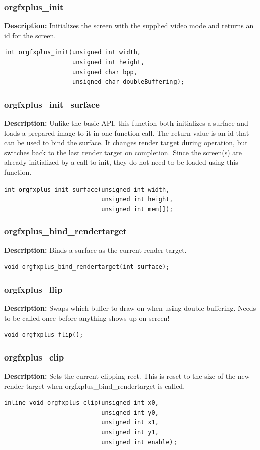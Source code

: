 \documentclass[10pt,a4paper]{article}
\begin{document}
\subsubsection{orgfxplus\_init}
\textbf{Description:} Initializes the screen with the supplied video mode and returns an id for the screen.
\begin{lstlisting}
int orgfxplus_init(unsigned int width,
                   unsigned int height,
                   unsigned char bpp,
                   unsigned char doubleBuffering);
\end{lstlisting}

\subsubsection{orgfxplus\_init\_surface}
\textbf{Description:} Unlike the basic API, this function both initializes a surface and loads a prepared image to it in one function call. The return value is an id that can be used to bind the surface. It changes render target during operation, but switches back to the last render target on completion. Since the screen(s) are already initialized by a call to init, they do not need to be loaded using this function.
\begin{lstlisting}
int orgfxplus_init_surface(unsigned int width,
                           unsigned int height,
                           unsigned int mem[]);
\end{lstlisting}

\subsubsection{orgfxplus\_bind\_rendertarget}
\textbf{Description:} Binds a surface as the current render target.
\begin{lstlisting}
void orgfxplus_bind_rendertarget(int surface);
\end{lstlisting}

\subsubsection{orgfxplus\_flip}
\textbf{Description:} Swaps which buffer to draw on when using double buffering. Needs to be called once before anything shows up on screen!
\begin{lstlisting}
void orgfxplus_flip();
\end{lstlisting}

\subsubsection{orgfxplus\_clip}
\textbf{Description:} Sets the current clipping rect. This is reset to the size of the new render target when orgfxplus\_bind\_rendertarget is called.
\begin{lstlisting}
inline void orgfxplus_clip(unsigned int x0,
                           unsigned int y0,
                           unsigned int x1,
                           unsigned int y1,
                           unsigned int enable);
\end{lstlisting}
\end{document}
